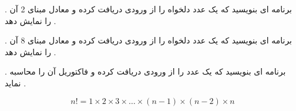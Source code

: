 \documentclass[12pt]{article}
\begin{document}
 . برنامه ای بنویسید که یک عدد دلخواه را از ورودی دریافت کرده و معادل مبنای 2 آن را نمایش دهد .














 . برنامه ای بنویسید که یک عدد دلخواه را از ورودی دریافت کرده و معادل مبنای 8 آن را نمایش دهد .















 . برنامه ای بنویسید که یک عدد را از ورودی دریافت کرده و فاکتوریل آن را محاسبه نماید .

\begin{tcolorbox}
$$
n ! = 1 \times 2 \times 3 \times \dots \times (n-1) \times (n-2) \times n
$$
\end{tcolorbox}
\end{document}
